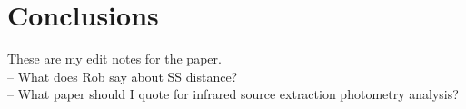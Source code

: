\documentclass[apj]{emulateapj}
\begin{document}
\section{Conclusions}



		
{}



\appendix
{\large These are my edit notes for the paper.} \\[.25in]

-- What does Rob say about SS distance?\\

-- What paper should I quote for infrared source extraction photometry analysis?




\end{document}
